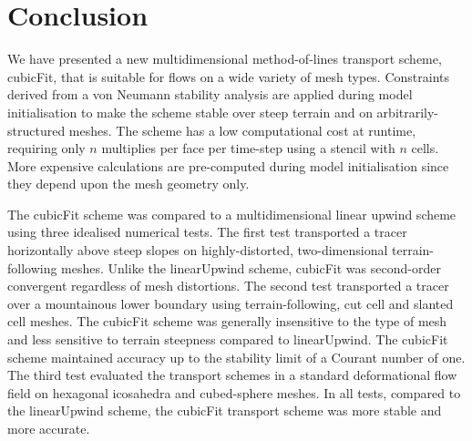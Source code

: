 \section{Conclusion}
\label{sec:conclusion}

We have presented a new multidimensional method-of-lines transport scheme, cubicFit, that is suitable for flows on a wide variety of mesh types.  Constraints derived from a von Neumann stability analysis are applied during model initialisation to make the scheme stable over steep terrain and on arbitrarily-structured meshes.
The scheme has a low computational cost at runtime, requiring only $n$ multiplies per face per time-step using a stencil with $n$ cells.  More expensive calculations are pre-computed during model initialisation since they depend upon the mesh geometry only.

The cubicFit scheme was compared to a multidimensional linear upwind scheme using three idealised numerical tests.
The first test transported a tracer horizontally above steep slopes on highly-distorted, two-dimensional terrain-following meshes.  Unlike the linearUpwind scheme, cubicFit was second-order convergent regardless of mesh distortions.
The second test transported a tracer over a mountainous lower boundary using terrain-following, cut cell and slanted cell meshes.
The cubicFit scheme was generally insensitive to the type of mesh and less sensitive to terrain steepness compared to linearUpwind.  The cubicFit scheme maintained accuracy up to the stability limit of a Courant number of one.
The third test evaluated the transport schemes in a standard deformational flow field on hexagonal icosahedra and cubed-sphere meshes.
In all tests, compared to the linearUpwind scheme, the cubicFit transport scheme was more stable and more accurate.

